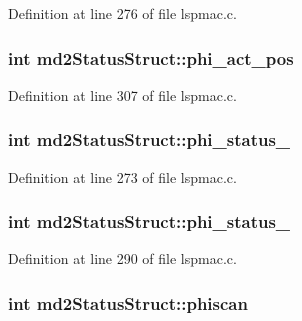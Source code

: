 Definition at line 276 of file lspmac.\-c.

\hypertarget{structmd2StatusStruct_a4de22995a72ff6e72a1a9ccab6d00620}{
\subsubsection[{phi\-\_\-act\-\_\-pos}]{\setlength{\rightskip}{0pt plus 5cm}int md2\-Status\-Struct\-::phi\-\_\-act\-\_\-pos}}\label{structmd2StatusStruct_a4de22995a72ff6e72a1a9ccab6d00620}


Definition at line 307 of file lspmac.\-c.

\hypertarget{structmd2StatusStruct_ad8b8fd90ffff43016e2adaab5ccbfa02}{
\subsubsection[{phi\-\_\-status\-\_\-1}]{\setlength{\rightskip}{0pt plus 5cm}int md2\-Status\-Struct\-::phi\-\_\-status\-\_}}\label{structmd2StatusStruct_ad8b8fd90ffff43016e2adaab5ccbfa02}


Definition at line 273 of file lspmac.\-c.

\hypertarget{structmd2StatusStruct_a0e6cea4c32cb34e602b9ac3d21259219}{
\subsubsection[{phi\-\_\-status\-\_\-2}]{\setlength{\rightskip}{0pt plus 5cm}int md2\-Status\-Struct\-::phi\-\_\-status\-\_}}\label{structmd2StatusStruct_a0e6cea4c32cb34e602b9ac3d21259219}


Definition at line 290 of file lspmac.\-c.

\hypertarget{structmd2StatusStruct_abe3d4a61a15f54590b061e23b45e659c}{
\subsubsection[{phiscan}]{\setlength{\rightskip}{0pt plus 5cm}int md2\-Status\-Struct\-::phiscan}}\label{structmd2StatusStruct_abe3d4a61a15f54590b061e23b45e659c}


